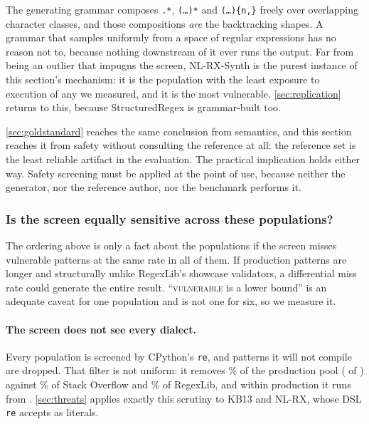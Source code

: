 \documentclass[11pt]{article}
\newcommand{\vuln}{\textsc{vulnerable}}
\begin{document}
The generating grammar composes \texttt{.*}, \texttt{(\ldots)*} and
\texttt{(\ldots)\{n,\}} freely over overlapping character classes, and those
compositions \emph{are} the backtracking shapes. A grammar that samples
uniformly from a space of regular expressions has no reason not to, because
nothing downstream of it ever runs the output. Far from being an outlier that
impugns the screen, NL-RX-Synth is the purest instance of this section's
mechanism: it is the population with the least exposure to execution of any we
measured, and it is the most vulnerable. \cref{sec:replication} returns to
this, because StructuredRegex is grammar-built too.

\cref{sec:goldstandard} reaches the same conclusion from semantics, and this
section reaches it from safety without consulting the reference at all: the
reference set is the least reliable artifact in the evaluation. The practical
implication holds either way. Safety screening must be applied at the point of
use, because neither the generator, nor the reference author, nor the
benchmark performs it.

\subsubsection{Is the screen equally sensitive across these populations?}
\label{sec:calibration}

The ordering above is only a fact about the populations if the screen misses
vulnerable patterns at the same rate in all of them. If production patterns
are longer and structurally unlike RegexLib's showcase validators, a
differential miss rate could generate the entire result. ``\vuln{} is a lower
bound'' is an adequate caveat for one population and is not one for six, so we
measure it.

\paragraph{The screen does not see every dialect.} Every population is
screened by CPython's \texttt{re}, and patterns it will not compile are
dropped. That filter is not uniform: it
removes \proddroppedpct{}\% of the production pool (\proddropped{} of
\prodpool{}) against \sodroppedpct{}\% of Stack Overflow and
\libdroppedpct{}\% of RegexLib, and within production it runs from
\droprange{}. \cref{sec:threats} applies exactly this scrutiny to KB13 and
NL-RX, whose DSL \texttt{re} accepts as literals.
\end{document}
